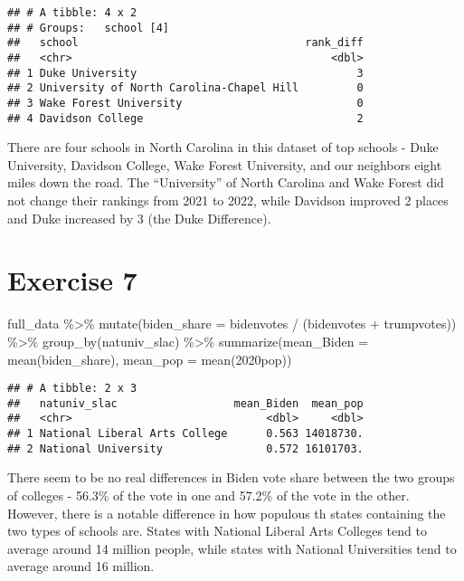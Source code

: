 \documentclass[
]{article}
\newenvironment{Shaded}{\begin{snugshade}}{\end{snugshade}}
\newcommand{\AttributeTok}[1]{\textcolor[rgb]{0.77,0.63,0.00}{#1}}
\newcommand{\FunctionTok}[1]{\textcolor[rgb]{0.00,0.00,0.00}{#1}}
\newcommand{\NormalTok}[1]{#1}
\newcommand{\SpecialCharTok}[1]{\textcolor[rgb]{0.00,0.00,0.00}{#1}}
\newcommand{\StringTok}[1]{\textcolor[rgb]{0.31,0.60,0.02}{#1}}
\begin{document}
\begin{verbatim}
## # A tibble: 4 x 2
## # Groups:   school [4]
##   school                                   rank_diff
##   <chr>                                        <dbl>
## 1 Duke University                                  3
## 2 University of North Carolina-Chapel Hill         0
## 3 Wake Forest University                           0
## 4 Davidson College                                 2
\end{verbatim}

There are four schools in North Carolina in this dataset of top schools
- Duke University, Davidson College, Wake Forest University, and our
neighbors eight miles down the road. The ``University'' of North
Carolina and Wake Forest did not change their rankings from 2021 to
2022, while Davidson improved 2 places and Duke increased by 3 (the Duke
Difference).

\hypertarget{exercise-7}{%
\section{Exercise 7}\label{exercise-7}}

\begin{Shaded}
\begin{Highlighting}[]
\NormalTok{full\_data }\SpecialCharTok{\%\textgreater{}\%}
  \FunctionTok{mutate}\NormalTok{(}\AttributeTok{biden\_share =}\NormalTok{ bidenvotes }\SpecialCharTok{/}\NormalTok{ (bidenvotes }\SpecialCharTok{+}\NormalTok{ trumpvotes)) }\SpecialCharTok{\%\textgreater{}\%}
  \FunctionTok{group\_by}\NormalTok{(natuniv\_slac) }\SpecialCharTok{\%\textgreater{}\%} 
  \FunctionTok{summarize}\NormalTok{(}\AttributeTok{mean\_Biden =} \FunctionTok{mean}\NormalTok{(biden\_share), }\AttributeTok{mean\_pop =} \FunctionTok{mean}\NormalTok{(}\StringTok{\textasciigrave{}}\AttributeTok{2020pop}\StringTok{\textasciigrave{}}\NormalTok{))}
\end{Highlighting}
\end{Shaded}

\begin{verbatim}
## # A tibble: 2 x 3
##   natuniv_slac                  mean_Biden  mean_pop
##   <chr>                              <dbl>     <dbl>
## 1 National Liberal Arts College      0.563 14018730.
## 2 National University                0.572 16101703.
\end{verbatim}

There seem to be no real differences in Biden vote share between the two
groups of colleges - 56.3\% of the vote in one and 57.2\% of the vote in
the other. However, there is a notable difference in how populous th
states containing the two types of schools are. States with National
Liberal Arts Colleges tend to average around 14 million people, while
states with National Universities tend to average around 16 million.
\end{document}

